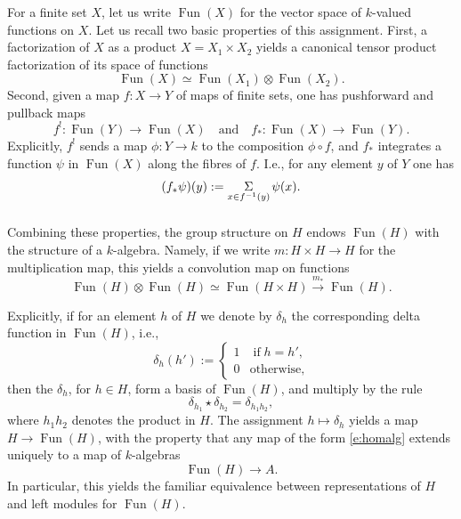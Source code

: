\documentclass[10pt]{amsart}
\newcommand{\on}{\operatorname}
\newcommand{\Fun}{\on{Fun}}
\theoremstyle{remark}
\newtheorem{re}[subsubsection]{Remark}
\numberwithin{equation}{section}
\begin{document}
	
	\subsubsection{} \label{ss:opsfinitesets}For a finite set $X$, let us write $\on{Fun}(X)$ for the 
	vector space of $k$-valued functions on $X$. Let us recall two basic 
	properties of this assignment. First, a factorization of $X$ as a product 
	$X = X_1 \times X_2$ yields a canonical tensor product factorization of its 
	space of functions
	$$ \Fun(X) \simeq \Fun(X_1) \otimes \Fun(X_2).$$Second, given a map $f: X 
	\rightarrow Y$ of maps of finite sets, one has pushforward and pullback maps
	$$
	 f^!: \on{Fun}(Y) \rightarrow \Fun(X) \quad \text{and} \quad   
	f_*: \Fun(X) \rightarrow \Fun(Y). 
	$$
	Explicitly, $f^!$ sends a map $\phi: Y \rightarrow k$ to the 
	composition $\phi \circ f$, and  $f_*$ integrates a function $\psi$ in 
	$\Fun(X)$ along the fibres of $f$. I.e.,  for any element $y$ of $Y$ one has
	\[
	(f_*\psi)(y) := \underset{x \in f^{-1}(y)}{\Sigma} \hspace{.5mm} \psi(x). 
	\]

	\subsubsection{} Combining these properties, the group structure on 
	$H$ endows $\Fun(H)$ with the structure of a $k$-algebra. Namely, if we 
	write 
	$
	m: H \times H \rightarrow H
	$
	for the multiplication map, this yields a convolution map on functions 
	\begin{equation} \label{e:convfun}
	\Fun(H) \otimes \Fun(H) \simeq \Fun(H \times H) \xrightarrow{ m_*}  
	\Fun(H). 
	\end{equation}
	
	Explicitly, if for an element $h$ of $H$ we denote by $\delta_h$ the 
	corresponding delta function in $\Fun(H)$, i.e., 
	\[
	\delta_h(h') := \begin{cases}   1 & \on{if } h = h', \\ 0 & \on{otherwise,} 
	\end{cases} 
	\]
	then the $\delta_h$, for $h \in H$, form a basis of $\Fun(H)$, and multiply 
	by the rule
	\[
	\delta_{h_1} \star \delta_{h_2} = \delta_{h_1h_2},
	\]
	where $h_1h_2$ denotes the product in $H$. The assignment $h \mapsto 
	\delta_h$ yields a map $H \rightarrow \Fun(H)$, with the property that any 
	map of the form \eqref{e:homalg} extends uniquely to a map of $k$-algebras 
	\[
	\Fun(H) \rightarrow A. 
	\]
	In particular, this yields the familiar equivalence between representations 
	of $H$ and left modules for $\Fun(H)$.
	
\end{document}
